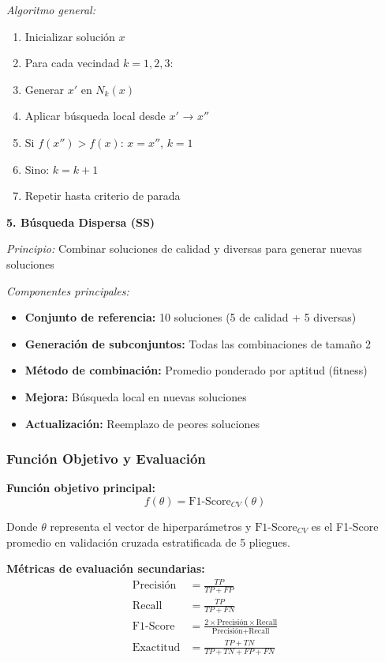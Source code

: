 \textit{Algoritmo general:}
\begin{enumerate}
    \item Inicializar solución $x$
    \item Para cada vecindad $k = 1, 2, 3$:
    \item \quad Generar $x'$ en $N_k(x)$
    \item \quad Aplicar búsqueda local desde $x'$ → $x''$
    \item \quad Si $f(x'') > f(x)$: $x = x''$, $k = 1$
    \item \quad Sino: $k = k + 1$
    \item Repetir hasta criterio de parada
\end{enumerate}

\textbf{5. Búsqueda Dispersa (SS)}

\textit{Principio:} Combinar soluciones de calidad y diversas para generar nuevas soluciones

\textit{Componentes principales:}
\begin{itemize}
    \item \textbf{Conjunto de referencia:} 10 soluciones (5 de calidad + 5 diversas)
    \item \textbf{Generación de subconjuntos:} Todas las combinaciones de tamaño 2
    \item \textbf{Método de combinación:} Promedio ponderado por aptitud (fitness)
    \item \textbf{Mejora:} Búsqueda local en nuevas soluciones
    \item \textbf{Actualización:} Reemplazo de peores soluciones
\end{itemize}

\subsubsection{Función Objetivo y Evaluación}

\textbf{Función objetivo principal:}
\begin{equation}
f(\theta) = \text{F1-Score}_{CV}(\theta)
\end{equation}

Donde $\theta$ representa el vector de hiperparámetros y $\text{F1-Score}_{CV}$ es el F1-Score promedio en validación cruzada estratificada de 5 pliegues.

\textbf{Métricas de evaluación secundarias:}
\begin{align}
\text{Precisión} &= \frac{TP}{TP + FP} \\
\text{Recall} &= \frac{TP}{TP + FN} \\
\text{F1-Score} &= \frac{2 \times \text{Precisión} \times \text{Recall}}{\text{Precisión} + \text{Recall}} \\
\text{Exactitud} &= \frac{TP + TN}{TP + TN + FP + FN}
\end{align}

